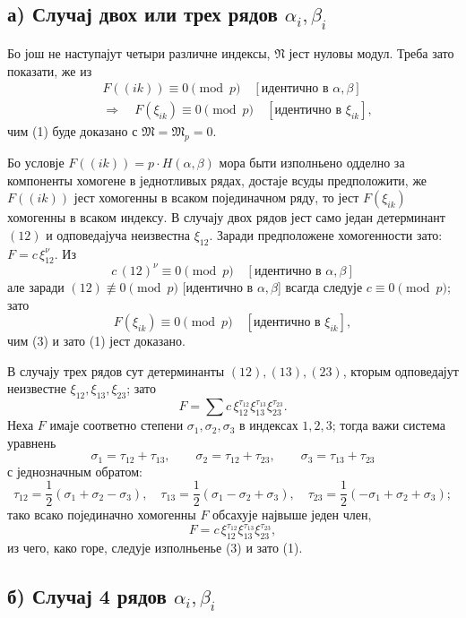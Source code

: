 ﻿\documentclass[11pt]{article}
\providecommand{\frM}{\mathfrak M}
\providecommand{\frN}{\mathfrak N}
\begin{document}
\subsection*{а) Случај двох или трех рядов \(\alpha_i,\beta_i\)}

Бо још не наступајут четыри различне индексы, \(\frN\) јест нуловы модул. Треба зато показати, же из
\begin{equation}
\begin{aligned}
        &F((ik))\equiv0\pmod p\quad [\text{идентично в \(\alpha,\beta\)}]\\
        &\Longrightarrow\quad
        F(\xi_{ik})\equiv0\pmod p\quad [\text{идентично в \(\xi_{ik}\)}],
\end{aligned}
\end{equation}
чим (1) буде доказано с \(\frM=\frM_p=0\).

Бо условје \(F((ik))=p\cdot H(\alpha,\beta)\) мора быти изполньено одделно за компоненты хомогене в једнотливых рядах, достаје всуды предположити, же \(F((ik))\) јест хомогенны в всаком појединачном ряду, то јест \(F(\xi_{ik})\) хомогенны в всаком индексу. В случају двох рядов јест само један детерминант \((12)\) и одповедајуча неизвестна \(\xi_{12}\). Заради предположене хомогенности зато: \(F=c\,\xi_{12}^\nu\). Из
\[
        c\,(12)^\nu\equiv0\pmod p\quad[\text{идентично в \(\alpha,\beta\)}]
\]
але заради \((12)\not\equiv0\pmod p\) [идентично в \(\alpha,\beta\)] всагда следује \(c\equiv0\pmod p\); зато
\[
        F(\xi_{ik})\equiv0\pmod p\quad [\text{идентично в \(\xi_{ik}\)}],
\]
чим (3) и зато (1) јест доказано.

В случају трех рядов сут детерминанты \((12),(13),(23)\), кторым одповедајут неизвестне \(\xi_{12},\xi_{13},\xi_{23}\); зато
\[
        F=\sum c\,\xi_{12}^{\tau_{12}}\xi_{13}^{\tau_{13}}\xi_{23}^{\tau_{23}}.
\]
Неха \(F\) имаје соответно степени \(\sigma_1,\sigma_2,\sigma_3\) в индексах \(1,2,3\); тогда важи система уравнень
\[
        \sigma_1=\tau_{12}+\tau_{13},\qquad
        \sigma_2=\tau_{12}+\tau_{23},\qquad
        \sigma_3=\tau_{13}+\tau_{23}
\]
с једнозначным обратом:
\[
        \tau_{12}=\frac12(\sigma_1+\sigma_2-\sigma_3),\quad
        \tau_{13}=\frac12(\sigma_1-\sigma_2+\sigma_3),\quad
        \tau_{23}=\frac12(-\sigma_1+\sigma_2+\sigma_3);
\]
тако всако појединачно хомогенны \(F\) обсахује највыше једен член,
\[
        F=c\,\xi_{12}^{\tau_{12}}\xi_{13}^{\tau_{13}}\xi_{23}^{\tau_{23}},
\]
из чего, како горе, следује изполньенье (3) и зато (1).

\subsection*{б) Случај 4 рядов \(\alpha_i,\beta_i\)}
\end{document}
